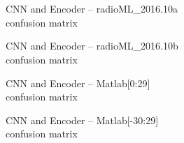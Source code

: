 \chapter{} \label{Appendix_A}

\begin{figure}[h!]
    \begin{center}
    \scalebox{1.1}{
        
    }
    \caption{CNN and Encoder -- radioML\_2016.10a\\ confusion matrix}
    \label{fig:confusion_matrix_radioml_16_a}
    \end{center}
\end{figure}

\begin{figure}[h!]
    \begin{center}
    \scalebox{1.1}{
        
    }
    \caption{CNN and Encoder -- radioML\_2016.10b\\ confusion matrix}
    \label{fig:confusion_matrix_radioml_16_b}
    \end{center}
\end{figure}

\begin{figure}[h!]
    \begin{center}
    \scalebox{1.1}{
        
    }
    \caption{CNN and Encoder -- Matlab[0:29]\\ confusion matrix}
    \label{fig:confusion_matrix_matlab_0_29}
    \end{center}
\end{figure}

\begin{figure}[h!]
    \begin{center}
    \scalebox{1.1}{
        
    }
    \caption{CNN and Encoder -- Matlab[-30:29]\\ confusion matrix}
    \label{fig:confusion_matrix_matlab_-30_29}
    \end{center}
\end{figure}